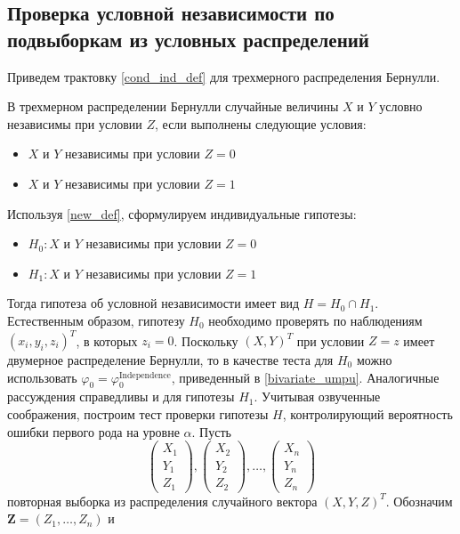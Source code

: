 \newpage
\subsection{Проверка условной независимости по подвыборкам из условных распределений}\label{twos}

Приведем трактовку \autoref{cond_ind_def} для трехмерного
распределения Бернулли. 
\begin{definition}\label{new_def}
    В трехмерном распределении Бернулли случайные величины $X$ и $Y$
    условно независимы при условии $Z$, 
    если выполнены следующие условия:
    \begin{itemize}
        \item $X$ и $Y$ независимы при условии $Z=0$
        \item $X$ и $Y$  независимы при условии $Z=1$
    \end{itemize}
\end{definition}
Используя \autoref{new_def}, сформулируем индивидуальные гипотезы:
\begin{itemize}
    \item $H_0 : X$ и $Y$ независимы при условии $Z=0$
    \item $H_1 : X$ и $Y$ независимы при условии $Z=1$
\end{itemize}
Тогда гипотеза об условной независимости имеет вид 
$H = H_0 \cap H_1$. Естественным образом, гипотезу 
$H_0$ необходимо проверять по наблюдениям
$(x_i,y_i,z_i)^T$, в которых $z_i=0$. Поскольку $(X,Y)^T$ при условии
$Z=z$ имеет двумерное распределение Бернулли, то
в качестве теста для $H_0$ можно использовать
$\varphi_0 = \varphi^{\text{Independence}}_0$, 
приведенный в \autoref{bivariate_umpu}. Аналогичные рассуждения 
справедливы и для гипотезы $H_1$. Учитывая озвученные соображения,
построим тест проверки гипотезы $H$, контролирующий вероятность
ошибки первого рода на уровне $\alpha$.
Пусть
$$
\begin{pmatrix}
        X_1 \\
        Y_1 \\
        Z_1
    \end{pmatrix},
    \begin{pmatrix}
        X_2 \\
        Y_2 \\
        Z_2
    \end{pmatrix}, \ldots,
    \begin{pmatrix}
        X_n \\
        Y_n \\
        Z_n
    \end{pmatrix}
$$ повторная выборка из распределения случайного вектора $(X,Y,Z)^T$. Обозначим $\mathbf{Z}=(Z_1,\ldots,Z_n)$ и 
